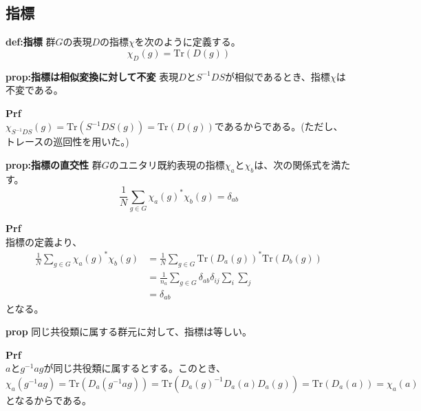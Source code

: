 \documentclass[a4paper,11pt]{jsarticle}
\begin{document}
\subsection{指標}
\begin{itembox}[l]{\textbf{def:指標}}
    群$G$の表現$D$の指標$\chi$を次のように定義する。
    \begin{equation}
        \chi_D(g) = \text{Tr}(D(g))
    \end{equation}
\end{itembox}
\begin{itembox}[l]{\textbf{prop:指標は相似変換に対して不変}}
    表現$D$と$S^{-1}DS$が相似であるとき、指標$\chi$は不変である。
\end{itembox}
\textbf{Prf}\\
$\chi_{S^{-1}DS}(g) = \text{Tr}(S^{-1}DS(g)) = \text{Tr}(D(g))$であるからである。(ただし、トレースの巡回性を用いた。)\\
\begin{itembox}[l]{\textbf{prop:指標の直交性}}
    群$G$のユニタリ既約表現の指標$\chi_a$と$\chi_b$は、次の関係式を満たす。
    \begin{equation}
        \frac{1}{N}\sum_{g \in G} \chi_a(g)^*\chi_b(g) = \delta_{ab}
    \end{equation}
\end{itembox}
\textbf{Prf}\\
指標の定義より、
\begin{align}
    \frac{1}{N}\sum_{g \in G} \chi_a(g)^*\chi_b(g) 
    &= \frac{1}{N}\sum_{g \in G} \text{Tr}(D_a(g))^*\text{Tr}(D_b(g))\\
    &= \frac{1}{n_a}\sum_{g \in G} \delta_{ab}\delta_{ij} \sum_i \sum_j\\
    &=\delta_{ab}
\end{align}
となる。\\
\begin{itembox}[l]{\textbf{prop}}
    同じ共役類に属する群元に対して、指標は等しい。

\end{itembox}
\textbf{Prf}\\
$a$と$g^{-1}ag$が同じ共役類に属するとする。このとき、
\begin{equation}
    \chi_a(g^{-1}ag) = \text{Tr}(D_a(g^{-1}ag)) = \text{Tr}(D_a(g)^{-1}D_a(a)D_a(g)) = \text{Tr}(D_a(a)) = \chi_a(a)
\end{equation}
となるからである。\\
\end{document}

